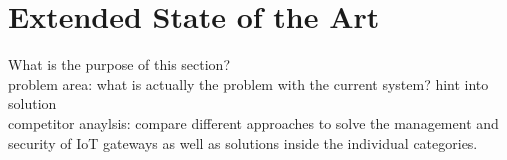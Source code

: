 \section{Extended State of the Art}
What is the purpose of this section?\\
problem area: what is actually the problem with the current system? hint into solution\\
competitor anaylsis: compare different approaches to solve the management and security of IoT gateways as well as solutions inside the individual categories. 




